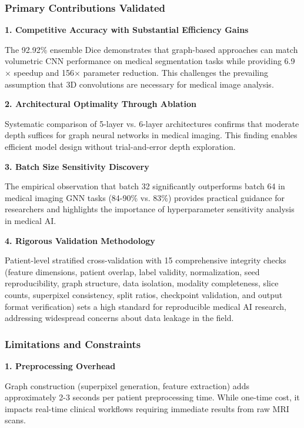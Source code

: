 \subsubsection{Primary Contributions Validated}

\textbf{1. Competitive Accuracy with Substantial Efficiency Gains}

The 92.92\% ensemble Dice demonstrates that graph-based approaches can match volumetric CNN performance on medical segmentation tasks while providing 6.9$\times$ speedup and 156$\times$ parameter reduction. This challenges the prevailing assumption that 3D convolutions are necessary for medical image analysis.

\textbf{2. Architectural Optimality Through Ablation}

Systematic comparison of 5-layer vs. 6-layer architectures confirms that moderate depth suffices for graph neural networks in medical imaging. This finding enables efficient model design without trial-and-error depth exploration.

\textbf{3. Batch Size Sensitivity Discovery}

The empirical observation that batch 32 significantly outperforms batch 64 in medical imaging GNN tasks (84-90\% vs. 83\%) provides practical guidance for researchers and highlights the importance of hyperparameter sensitivity analysis in medical AI.

\textbf{4. Rigorous Validation Methodology}

Patient-level stratified cross-validation with 15 comprehensive integrity checks (feature dimensions, patient overlap, label validity, normalization, seed reproducibility, graph structure, data isolation, modality completeness, slice counts, superpixel consistency, split ratios, checkpoint validation, and output format verification) sets a high standard for reproducible medical AI research, addressing widespread concerns about data leakage in the field.

\subsubsection{Limitations and Constraints}

\textbf{1. Preprocessing Overhead}

Graph construction (superpixel generation, feature extraction) adds approximately 2-3 seconds per patient preprocessing time. While one-time cost, it impacts real-time clinical workflows requiring immediate results from raw MRI scans.

